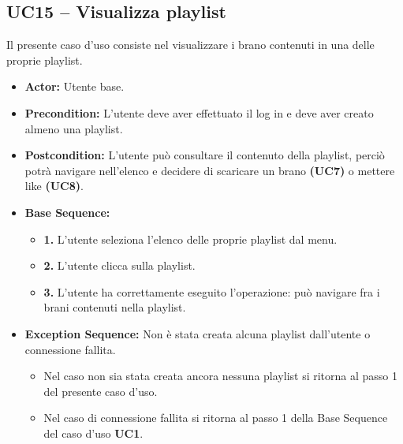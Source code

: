 \subsection{UC15 -- Visualizza playlist}
Il presente caso d'uso consiste nel visualizzare i brano contenuti in una delle proprie playlist. 
\begin{itemize}
    \item \textbf{Actor:} Utente base.
    \item \textbf{Precondition:} L'utente deve aver effettuato il log in e deve aver creato almeno una playlist.
    \item \textbf{Postcondition:} L'utente può consultare il contenuto della 
    playlist, perciò potrà navigare nell'elenco e decidere di scaricare 
    un brano \textbf{(UC7)} o mettere like \textbf{(UC8)}.
    \item \textbf{Base Sequence:}
    \begin{itemize}
        \item \textbf{1.} L'utente seleziona l'elenco delle proprie playlist dal menu.
        \item \textbf{2.} L'utente clicca sulla playlist.
        \item \textbf{3.} L'utente ha correttamente eseguito l'operazione: può navigare fra i brani contenuti nella playlist.
    \end{itemize}
    \item \textbf{Exception Sequence:} Non è stata creata alcuna playlist dall'utente o connessione fallita.
    \begin{itemize}
        \item Nel caso non sia stata creata ancora nessuna playlist si ritorna al passo 1 del presente caso d'uso.
        \item Nel caso di connessione fallita si ritorna al passo 1 della Base Sequence del caso d'uso \textbf{UC1}.
    \end{itemize}
\end{itemize}
\vspace{1cm}

